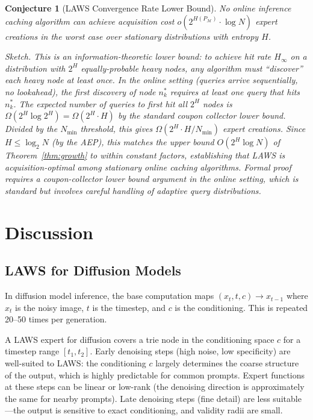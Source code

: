 \documentclass[11pt]{article}
\newtheorem{conjecture}{Conjecture}
\begin{document}
\begin{conjecture}[LAWS Convergence Rate Lower Bound]
\label{conj:lower_rate}
No online inference caching algorithm can achieve acquisition cost
$o(2^{H(P_{\mathcal{M}})} \cdot \log N)$ expert creations in the worst case
over stationary distributions with entropy $H$.

\emph{Sketch.}
This is an information-theoretic lower bound: to achieve hit rate $H_\infty$
on a distribution with $2^H$ equally-probable heavy nodes, any algorithm must
``discover'' each heavy node at least once.  In the online setting (queries
arrive sequentially, no lookahead), the first discovery of node $n^*_k$ requires
at least one query that hits $n^*_k$.  The expected number of queries to first
hit all $2^H$ nodes is $\Omega(2^H \log 2^H) = \Omega(2^H \cdot H)$ by the
standard coupon collector lower bound.  Divided by the $N_{\min}$ threshold,
this gives $\Omega(2^H \cdot H / N_{\min})$ expert creations.  Since $H \leq \log_2 N$
(by the AEP), this matches the upper bound $O(2^H \log N)$ of Theorem~\ref{thm:growth}
to within constant factors, establishing that LAWS is \emph{acquisition-optimal}
among stationary online caching algorithms.  Formal proof requires a coupon-collector
lower bound argument in the online setting, which is standard but involves careful
handling of adaptive query distributions.
\end{conjecture}

\section{Discussion}
\label{sec:discussion}

\subsection{LAWS for Diffusion Models}

In diffusion model inference, the base computation maps
$(x_t, t, c) \to x_{t-1}$ where $x_t$ is the noisy image, $t$ is the
timestep, and $c$ is the conditioning.  This is repeated 20--50 times per
generation.

A LAWS expert for diffusion covers a trie node in the conditioning space
$c$ for a timestep range $[t_1, t_2]$.  Early denoising steps (high noise,
low specificity) are well-suited to LAWS: the conditioning $c$ largely
determines the coarse structure of the output, which is highly predictable
for common prompts.  Expert functions at these steps can be linear or
low-rank (the denoising direction is approximately the same for nearby prompts).
Late denoising steps (fine detail) are less suitable---the output is sensitive
to exact conditioning, and validity radii are small.
\end{document}
